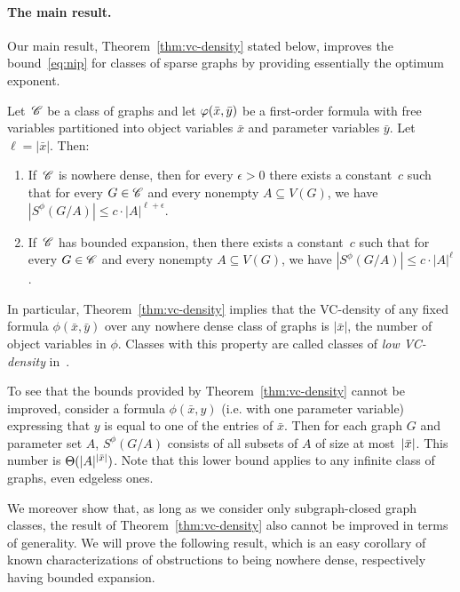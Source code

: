 \paragraph{The main result.}
Our main result, Theorem~\ref{thm:vc-density} stated below, improves
the bound~\eqref{eq:nip} for classes of sparse graphs by providing
essentially the optimum exponent.

 \setcounter{vcupper}{\value{theorem}}
 
 \begin{theorem}\label{thm:vc-density}
   Let\, $\mathscr{C}$ be a class of graphs and let $\varphi(\bar{x},\bar{y})$ be a
   first-order formula with free variables partitioned into object
   variables $\bar x$ and parameter variables $\bar y$. Let
   $\ell=|\bar x|$. Then:
\begin{enumerate}
\item If\, $\mathscr{C}$ is nowhere dense, then for every $\epsilon>0$ 
there exists a constant~$c$ such that for every $G\in \mathscr{C}$ and every nonempty
$A\subseteq V(G)$, we have $|S^\phi(G/A)|\leq c\cdot |A|^{\ell+\epsilon}.$
\item If\, $\mathscr{C}$ has bounded expansion, then there exists a
  constant~$c$ such that for every $G\in \mathscr{C}$ and every nonempty
  $A\subseteq V(G)$, we have $|S^\phi(G/A)|\leq c\cdot |A|^\ell$.
\end{enumerate}
 \end{theorem}

 In particular, Theorem~\ref{thm:vc-density} implies that the
 VC-density of any fixed formula $\phi(\bar x,\bar y)$ over any
 nowhere dense class of graphs is $|\bar x|$, the number of object
 variables in $\phi$.  Classes with this property are called classes
 of {\em low VC-density} in~\cite{guingona2013vc}.

 \smallskip To see that the bounds provided by
 Theorem~\ref{thm:vc-density} cannot be improved, consider a formula
 $\phi(\bar x,y)$ (i.e. with one parameter variable) expressing that
 $y$ is equal to one of the entries of $\bar x$. Then for each graph
 $G$ and parameter set $A$, $S^{\phi}(G/A)$ consists of all subsets of
 $A$ of size at most~$|\bar{x}|$. This number is
 $\Theta(|A|^{|\bar{x}|})$. Note that this lower bound applies to any
 infinite class of graphs, even edgeless ones.

 \smallskip We moreover show that, as long as we consider only
 subgraph-closed graph classes, the result of
 Theorem~\ref{thm:vc-density} also cannot be improved in terms of
 generality.  We will prove the following result, which is an easy
 corollary of known characterizations of obstructions to being nowhere
 dense, respectively having bounded expansion.

